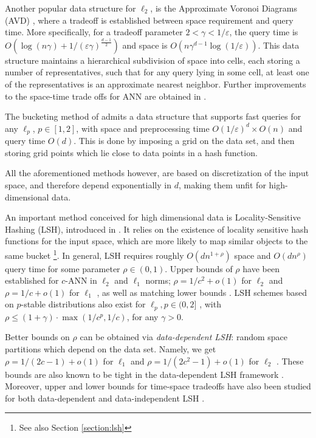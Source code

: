 \documentclass[10pt,a4paper,twoside]{book}
\newcommand{\eps}{\varepsilon}
\theoremstyle{definition}
\theoremstyle{remark}
\begin{document}
Another popular data structure for $\ell_2$, is the Approximate Voronoi Diagrams (AVD) \cite{AMM09}, where a tradeoff is established between space requirement and query time. More specifically, for a tradeoff parameter $2< \gamma < 1/ \eps$, the query time is $O(\log (n \gamma) + 1/(\eps \gamma)^{\frac{d-1}{2}})$ and space is $O(n \gamma^{d-1} \log (1/ \eps))$. This data structure maintains a hierarchical subdivision of space into cells, each storing a number of representatives, such that for any query lying in some cell, at least one of the representatives is an approximate nearest neighbor. Further improvements to the space-time trade offs for ANN are obtained in \cite{AdFM18}.

The bucketing method of \cite{HIM12} admits a data structure that supports fast queries for any $\ell_p$, $p \in [1,2]$, with space and preprocessing time $O(1/ \eps)^d \times O(n)$ and query time $O(d)$. This is done by imposing a grid on the data set, and then storing grid points which lie close to data points in a hash function. 

All the aforementioned methods however, are based on discretization of the input space, and therefore depend exponentially in $d$, making them unfit for high-dimensional data. 

An important method conceived for high dimensional data is Locality-Sensitive Hashing (LSH), introduced in \cite{IM98}. It relies on the existence of locality sensitive hash functions for the input space, which are more likely to map similar objects to the same bucket \footnote{See also Section \ref{section:lsh}}. In general, LSH requires roughly $O(dn^{1+\rho})$ space and $O(dn^{\rho})$ query time for some parameter $\rho \in (0,1)$. Upper bounds of $\rho$ have been established for $c$-ANN in $\ell_2$ and $\ell_1$ norms; $\rho = 1/c^2 + o(1)$ for $\ell_2$ and $\rho = 1/c + o(1)$ for $\ell_1$ \cite{AI08, IM98}, as well as matching lower bounds \cite{MNP07, OWZ14}. LSH schemes based on $p$-stable distributions also exist for $\ell_p, p \in (0,2]$ \cite{DIIM04}, with $\rho \leq (1 {+} \gamma) \cdot \max{(1/c^p, 1/c)}$, for any $\gamma>0$.

Better bounds on $\rho$ can be obtained via \textit{data-dependent LSH}: random space partitions which depend on the data set. Namely, we get $\rho= 1/(2c-1) + o(1)$ for $\ell_1$ and $\rho= 1/(2c^2-1) + o(1)$ for $\ell_2$ \cite{AINR14, AR15}. These bounds are also known to be tight in the data-dependent LSH framework \cite{AR16}. Moreover, upper and lower bounds for time-space tradeoffs have also been studied for both data-dependent and data-independent LSH \cite{ALRW17}.
\end{document}
